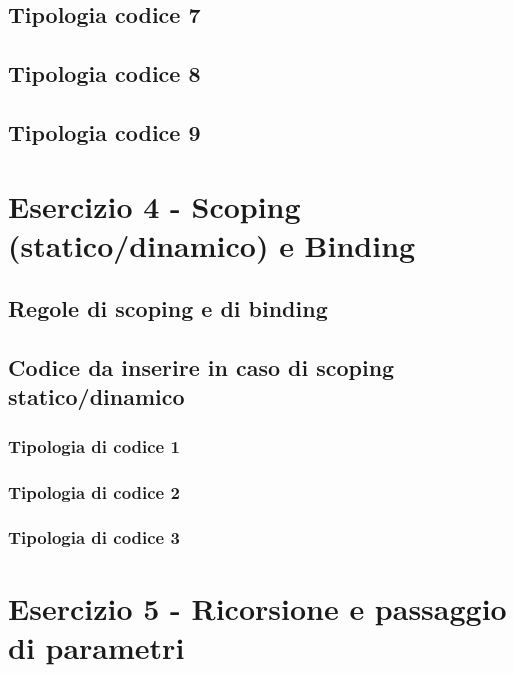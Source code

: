 \documentclass[a4paper]{article}
\begin{document}
	\subsection{Tipologia codice 7}
	
	
	\subsection{Tipologia codice 8}
	
	
	\subsection{Tipologia codice 9}
	
	
	\section{Esercizio 4 - Scoping (statico/dinamico) e Binding}
	
	\subsection{Regole di scoping e di binding}
	
	\subsection{Codice da inserire in caso di scoping statico/dinamico}
	
	\subsubsection{Tipologia di codice 1}
	
	\subsubsection{Tipologia di codice 2}
	
	\subsubsection{Tipologia di codice 3}
	
	\section{Esercizio 5 - Ricorsione e passaggio di parametri}
	
\end{document}
